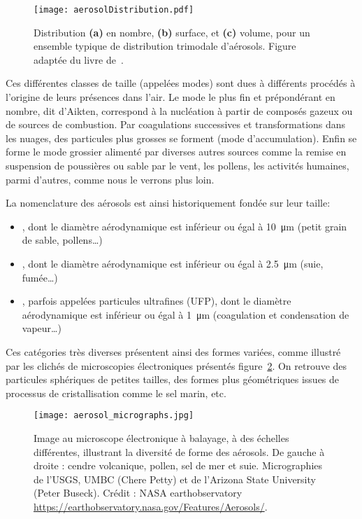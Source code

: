 \begin{figure}[ht]
    \centering
    \texttt{[image: aerosolDistribution.pdf]}
    \caption{Distribution \textbf{(a)} en nombre, \textbf{(b)} surface, et
        \textbf{(c)} volume, pour un ensemble typique de distribution trimodale
        d'aérosols. Figure adaptée du livre de~\cite{seinfieldAtmospheric1998}.}
    \label{fig:aerosolDistribution}
\end{figure}

Ces différentes classes de taille (appelées modes) sont dues à différents procédés à
l'origine de leurs présences dans l'air. Le mode le plus fin et prépondérant en nombre,
dit d'Aikten, correspond à la nucléation à partir de composés gazeux ou de sources de
combustion.  Par coagulations successives et transformations dans les nuages, des
particules plus grosses se forment (mode d'accumulation).  Enfin se forme le mode grossier
alimenté par diverses autres sources comme la remise en suspension de poussières ou sable
par le vent, les pollens, les activités humaines, parmi d'autres, comme nous le verrons
plus loin.

La nomenclature des aérosols est ainsi historiquement fondée sur leur taille:
\begin{itemize}
    \item \PMdix, dont le diamètre aérodynamique est inférieur ou égal à \SI{10}{\um} (petit
        grain de sable, pollens…)
    \item \PMdc, dont le diamètre aérodynamique est inférieur ou égal à \SI{2.5}{\um}
        (suie, fumée…)
    \item \PMun, parfois appelées particules ultrafines (UFP), dont le diamètre
        aérodynamique est inférieur ou égal à \SI{1}{\um} (coagulation et condensation de
        vapeur…)
\end{itemize}


Ces catégories très diverses présentent ainsi des formes variées, comme illustré par les
clichés de microscopies électroniques présentés figure~\ref{fig:micrography}. On retrouve
des particules sphériques de petites tailles, des formes plus géométriques issues de
processus de cristallisation comme le sel marin, etc.

\begin{figure}[ht]
    \centering
    \texttt{[image: aerosol\_micrographs.jpg]}
    \caption{Image au microscope électronique à balayage, à des échelles différentes,
        illustrant la diversité de forme des aérosols.
        De gauche à droite : cendre volcanique, pollen, sel de mer et suie. Micrographies de
        l'USGS, UMBC (Chere Petty) et de l'Arizona State University (Peter Buseck). 
        Crédit : NASA earthobservatory \url{https://earthobservatory.nasa.gov/Features/Aerosols/}.
    }
    \label{fig:micrography}
\end{figure}

